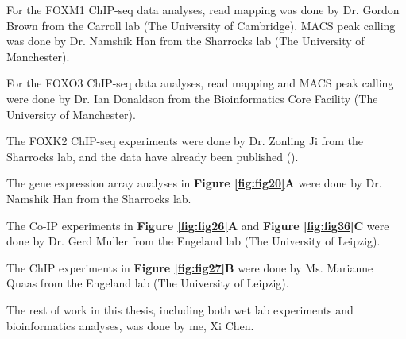 \documentclass[12pt,a4paper]{report}
\begin{document}
\begin{uomothercontributions}
For the FOXM1 ChIP-seq data analyses, read mapping was done by Dr. Gordon Brown from the Carroll lab (The University of Cambridge). MACS peak calling was done by Dr. Namshik Han from the Sharrocks lab (The University of Manchester).

For the FOXO3 ChIP-seq data analyses, read mapping and MACS peak calling were done by Dr. Ian Donaldson from the Bioinformatics Core Facility (The University of Manchester).

The FOXK2 ChIP-seq experiments were done by Dr. Zonling Ji from the Sharrocks lab, and the data have already been published (\cite{ji2012the}).

The gene expression array analyses in \textbf{Figure \ref{fig:fig20}A} were done by Dr. Namshik Han from the Sharrocks lab.

The Co-IP experiments in \textbf{Figure \ref{fig:fig26}A} and \textbf{Figure \ref{fig:fig36}C} were done by Dr. Gerd Muller from the Engeland lab (The University of Leipzig).

The ChIP experiments in \textbf{Figure \ref{fig:fig27}B} were done by Ms. Marianne Quaas from the Engeland lab (The University of Leipzig).

The rest of work in this thesis, including both wet lab experiments and bioinformatics analyses, was done by me, Xi Chen.   
\end{uomothercontributions}
\end{document}
